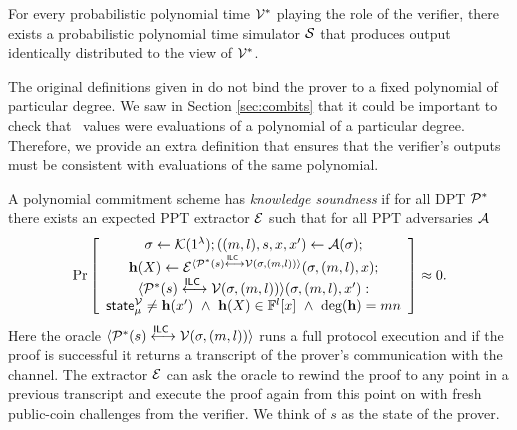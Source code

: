 \begin{definition}
For every probabilistic polynomial time $\mathcal{V}^*$ playing the role of the verifier, there exists a probabilistic polynomial time simulator $\mathcal{S}$ that produces output identically distributed to the view of $\mathcal{V}^*$.
\end{definition}

The original definitions given in \cite{NaorP06} do not bind the prover to a fixed polynomial of particular degree. We saw in Section \ref{sec:combits} that it could be important to check that \ILCopen\ values were evaluations of a polynomial of a particular degree. Therefore, we provide an extra definition that ensures that the verifier's outputs must be consistent with evaluations of the same polynomial.

\begin{definition}
A polynomial commitment scheme has \emph{knowledge soundness} if for all DPT $\mathcal{P}^*$ there exists an expected PPT extractor $\mathcal{E}$ such that for all PPT adversaries $\mathcal{A}$
$$\Pr\left[\begin{array}{c} \mathsf{\sigma}\gets \mathcal{K}(1^{\lambda});((m,l),s,x,x') \gets \mathcal{A}(\mathsf{\sigma}); \\
\mathbf{h}(X) \gets \mathcal{E}^{\langle \mathcal{P}^*(s)\overset{\mathsf{ILC}~}{\longleftrightarrow}\mathcal{V}(\mathsf{\sigma},(m,l))\rangle}(\mathsf{\sigma},(m,l),x); \\
\langle \mathcal{P}^*(s)\overset{\mathsf{ILC}~}{\longleftrightarrow}\mathcal{V}(\mathsf{\sigma},(m,l))\rangle(\mathsf{\sigma},(m,l),x') : \\
\mathsf{state}^{\mathcal{V}}_\mu \neq \mathbf{h}(x') ~\wedge~  \mathbf{h}(X) \in \mathbb{F}^l[x] ~\wedge~ \text{deg}(\mathbf{h}) = mn \end{array}\right]\approx 0.$$ 
Here the oracle $\langle \mathcal{P}^*(s)\overset{\mathsf{ILC}~}{\longleftrightarrow}\mathcal{V}(\mathsf{\sigma},(m,l))\rangle$ runs a full protocol execution and if the proof is successful it returns a transcript of the prover's communication with the channel. The extractor $\mathcal{E}$ can ask the oracle to rewind the proof to any point in a previous transcript and execute the proof again from this point on with fresh public-coin challenges from the verifier. We think of $s$ as the state of the prover.
\end{definition}
%
